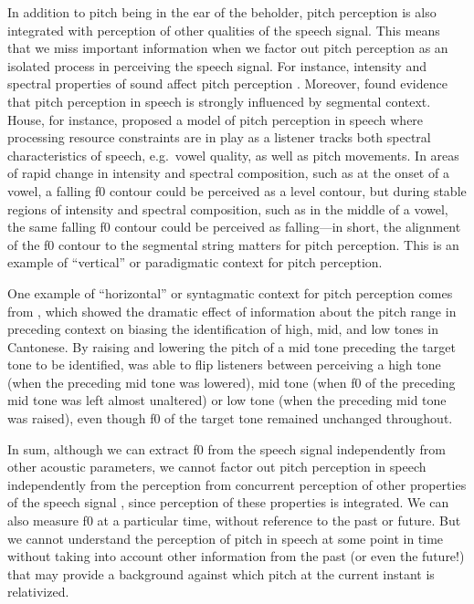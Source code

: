 \documentclass[12pt]{article}
\begin{document}
In addition to pitch being in the ear of the beholder, pitch
perception is also integrated with perception of other qualities of
the speech signal. This means that we miss important information when
we factor out pitch perception as an isolated process in perceiving
the speech signal. For instance, intensity and spectral properties of
sound affect pitch perception \citep[p.\ 146]{Baken:2000a}. Moreover,
\citet{Rose:1988,House:1990} found evidence that pitch perception in speech is
strongly influenced by segmental context. House, for instance,  proposed a model of
pitch perception in speech where processing resource constraints are
in play as a listener tracks both spectral characteristics of speech,
e.g.\ vowel quality, as well as pitch movements. In areas of rapid
change in intensity and spectral composition, such as at the onset of
a vowel, a falling f0 contour could be perceived as a level contour,
but during stable regions of intensity and spectral composition, such
as in the middle of a vowel, the same falling f0 contour could be
perceived as falling---in short, the alignment of the f0 contour to the
segmental string matters for pitch perception. This is an example of
``vertical'' or paradigmatic context for pitch perception. 

One example
of ``horizontal'' or syntagmatic context for pitch perception comes
from \citet{Wong:2003}, which showed the dramatic effect of
information about the pitch range in preceding context on biasing the
identification of high, mid, and low tones in Cantonese. By raising
and lowering the pitch of a mid tone preceding the target tone to be
identified, \citet{Wong:2003} was able to flip listeners between
perceiving a high tone (when the preceding mid tone was lowered), mid
tone (when f0 of the preceding mid tone was left almost
unaltered) or low tone (when the preceding mid tone was raised), even
though f0 of the target tone remained unchanged throughout.   

In sum, although we can extract f0 from the speech signal
independently from other acoustic parameters, we cannot factor out
pitch perception in speech independently from the perception from
concurrent perception of other properties of the speech signal
, since perception of these properties is integrated. We can also
measure f0 at a particular time, without reference to the past or
future. But we cannot understand the perception of pitch in speech at
some point in time without taking into account other information from
the past (or even the future!) that may provide a background against
which pitch at the current instant is relativized.
\end{document}
